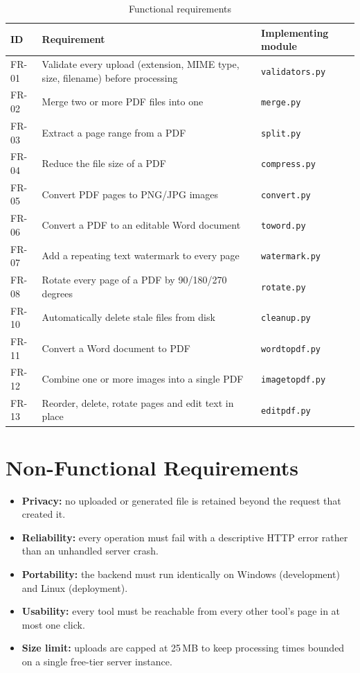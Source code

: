 \documentclass[12pt,a4paper]{report}
\begin{document}
\begin{table}[h]
\centering
\caption{Functional requirements}
\label{tab:fr}
\begin{tabular}{@{}p{1.6cm}p{5.5cm}p{6.5cm}@{}}
\toprule
\textbf{ID} & \textbf{Requirement} & \textbf{Implementing module} \\
\midrule
FR-01 & Validate every upload (extension, MIME type, size, filename) before processing & \texttt{validators.py} \\
FR-02 & Merge two or more PDF files into one & \texttt{merge.py} \\
FR-03 & Extract a page range from a PDF & \texttt{split.py} \\
FR-04 & Reduce the file size of a PDF & \texttt{compress.py} \\
FR-05 & Convert PDF pages to PNG/JPG images & \texttt{convert.py} \\
FR-06 & Convert a PDF to an editable Word document & \texttt{toword.py} \\
FR-07 & Add a repeating text watermark to every page & \texttt{watermark.py} \\
FR-08 & Rotate every page of a PDF by 90/180/270 degrees & \texttt{rotate.py} \\
FR-10 & Automatically delete stale files from disk & \texttt{cleanup.py} \\
FR-11 & Convert a Word document to PDF & \texttt{wordtopdf.py} \\
FR-12 & Combine one or more images into a single PDF & \texttt{imagetopdf.py} \\
FR-13 & Reorder, delete, rotate pages and edit text in place & \texttt{editpdf.py} \\
\bottomrule
\end{tabular}
\end{table}

\section{Non-Functional Requirements}
\begin{itemize}
  \item \textbf{Privacy:} no uploaded or generated file is retained beyond the request that
        created it.
  \item \textbf{Reliability:} every operation must fail with a descriptive HTTP error rather than
        an unhandled server crash.
  \item \textbf{Portability:} the backend must run identically on Windows (development) and Linux
        (deployment).
  \item \textbf{Usability:} every tool must be reachable from every other tool's page in at most
        one click.
  \item \textbf{Size limit:} uploads are capped at 25\,MB to keep processing times bounded on a
        single free-tier server instance.
\end{itemize}
\end{document}
